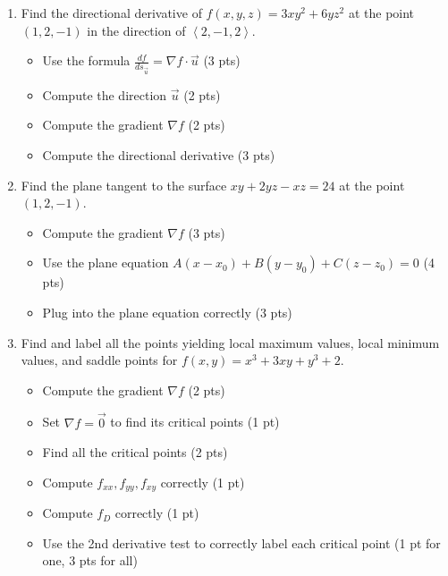 \documentclass[12pt]{article}
\newcommand{\liner}{\noindent\underline{\hspace*{7in}}}
\begin{document}
\begin{enumerate}

\item Find the directional derivative of $f(x,y,z)=3xy^2+6yz^2$ at the point $(1,2,-1)$ in the direction of $\left<2,-1,2\right>$.

  \begin{itemize}
    \item Use the formula $\frac{df}{ds_{\vec{u}}} = \nabla f \cdot \vec{u}$ (3 pts)
    \item Compute the direction $\vec{u}$ (2 pts)
    \item Compute the gradient $\nabla f$ (2 pts)
    \item Compute the directional derivative (3 pts)
  \end{itemize}

\vspace*{7in}

\liner

\newpage


\item Find the plane tangent to the surface $xy+2yz-xz=24$ at the point $(1,2,-1)$.

  \begin{itemize}
    \item Compute the gradient $\nabla f$ (3 pts)
    \item Use the plane equation $A(x-x_0)+B(y-y_0)+C(z-z_0)=0$ (4 pts)
    \item Plug into the plane equation correctly (3 pts)
  \end{itemize}

\vspace*{7in}

\liner

\newpage


\item Find and label all the points yielding local maximum values, local minimum values, and saddle points for $f(x,y)=x^3+3xy+y^3+2$.

  \begin{itemize}
    \item Compute the gradient $\nabla f$ (2 pts)
    \item Set $\nabla f = \vec{0}$ to find its critical points (1 pt)
    \item Find all the critical points (2 pts)
    \item Compute $f_{xx}, f_{yy}, f_{xy}$ correctly (1 pt)
    \item Compute $f_D$ correctly (1 pt)
    \item Use the 2nd derivative test to correctly label each critical point (1 pt for one, 3 pts for all)
  \end{itemize}


\end{enumerate}
\end{document}
